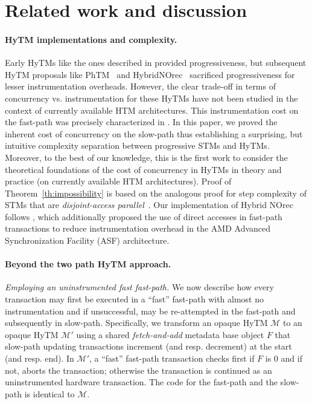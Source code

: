 \section{Related work and discussion}
\label{sec:rel}
%
\paragraph*{HyTM implementations and complexity.}
Early HyTMs like the ones described in \cite{damronhytm, kumarhytm} provided progressiveness, but
subsequent HyTM proposals like PhTM~\cite{phasedtm} and HybridNOrec~\cite{hybridnorec} sacrificed progressiveness for lesser instrumentation overheads.
However, the clear trade-off in terms of concurrency vs. instrumentation for these HyTMs have not been studied in the context of currently available HTM
architectures. This instrumentation cost on the fast-path was precisely characterized in \cite{hytm14disc}.
In this paper, we proved the inherent cost of concurrency on the slow-path thus establishing a surprising, 
but intuitive complexity separation between progressive STMs and HyTMs.
Moreover, to the best of our knowledge, this is the first work to consider the theoretical foundations of the cost of concurrency in 
HyTMs in theory and practice (on currently available HTM architectures).
Proof of Theorem~\ref{th:impossibility} is based on the analogous proof for step complexity of STMs that are \emph{disjoint-access parallel}~\cite{prog15-pact, tm-book}.
Our implementation of Hybrid NOrec follows \cite{hynorecriegel}, which additionally proposed the use of direct accesses
in fast-path transactions to reduce instrumentation overhead in the AMD Advanced Synchronization Facility (ASF) architecture.

\paragraph*{Beyond the two path HyTM approach.}
\vspace{1mm}\noindent\textit{Employing an uninstrumented fast fast-path.}
We now describe how every transaction may first be executed in a ``fast'' fast-path with almost no instrumentation
and if unsuccessful, may be re-attempted in the fast-path and subsequently in slow-path.
Specifically, we transform an opaque HyTM $\mathcal{M}$ to an opaque
HyTM $\mathcal{M}'$ using a shared \emph{fetch-and-add} metadata base object $F$ that slow-path updating transactions
increment (and resp. decrement) at the start (and resp. end). In $\mathcal{M}'$, a ``fast'' fast-path transaction checks first if $F$ is $0$
and if not, aborts the transaction; otherwise the transaction is continued as an uninstrumented hardware transaction.
The code for the fast-path and the slow-path is identical to $\mathcal{M}$.

